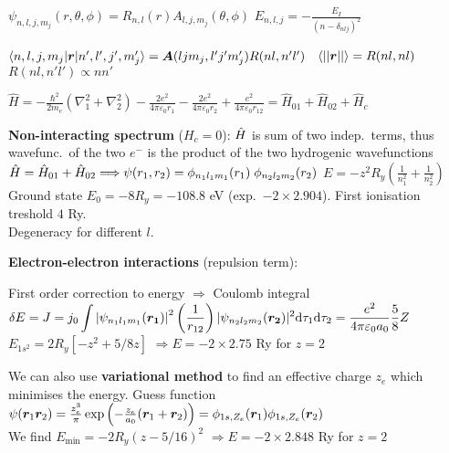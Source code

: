 
\begin{squishlist}
    \item $\psi_{n,l,j,m_j}(r,\theta, \phi) = R_{n,l}(r) A_{l,j,m_j}(\theta,\phi)$ \quad $E_{n,l,j} = - \frac{E_I}{(n - \delta_{nlj})^2}$
    \item $\braket{n,l,j,m_j|\bm{r}|n',l',j',m_j'} = \bm{A}(ljm_j, l'j'm_j')R(nl,n'l')$ \, $\braket{||\bm{r}||} = R(nl,nl)$ \, $R(nl,n'l') \propto nn'$
\end{squishlist}

\begin{squishlist}
    \item $\hat{H} = - \frac{\hbar^2}{2m_e}(\nabla^2_1 + \nabla^2_2) - \frac{2e^2}{4\pi \varepsilon_0 r_1} - \frac{2e^2}{4\pi \varepsilon_0 r_2} + \frac{e^2}{4\pi \varepsilon_0 r_{12}} = \hat{H}_{01} + \hat{H}_{02} + \hat{H}_c$
    \item \textbf{Non-interacting spectrum} ($H_c = 0$): $\hat{H}$ is sum of two indep.\ terms, thus wavefunc.\ of the two $e^-$ is the product of the two hydrogenic wavefunctions \\
    $ \hat{H} = \hat{H}_{01} + \hat{H}_{02} \Longrightarrow \psi(r_1,r_2) = \phi_{n_1 l_1 m_1}(r_1) \; \phi_{n_2 l_2 m_2}(r_2)$ \qquad $E = -z^2 R_y \left( \frac{1}{n_1^2}+ \frac{1}{n_2^2} \right)$ \\
    Ground state $E_0 = -8 R_y = -108.8$ eV (exp.\ $-2\times 2.904$). First ionisation treshold $4$ Ry. \\
    Degeneracy for different $l$.

    \item \textbf{Electron-electron interactions} (repulsion term):
    \begin{squishitemize}
        \item First order correction to energy $\Rightarrow$ Coulomb integral \\
        $ \displaystyle \delta E = J = j_0 \int \left|\psi_{n_1 l_1 m_1}(\bm{r_1})\right|^2 \left(\frac{1}{r_{12}}\right) |\psi_{n_2 l_2 m_2}(\bm{r_2})|^2  \textrm{d} \tau_1 \textrm{d} \tau_2 = \frac{e^2}{4 \pi \varepsilon_0 a_0} \frac{5}{8}Z$ \\
        $E_{1s^2} = 2 R_y [-z^2 + 5/8 z]$ \qquad $\Longrightarrow E = -2\times 2.75$ Ry for $z=2$
        \item We can also use \textbf{variational method} to find an effective charge $z_e$ which minimises the energy. Guess function $\psi(\bm{r}_1 \bm{r}_2) = \frac{z_e^3}{\pi}\exp\left(-\frac{z_e}{a_0}(\bm{r}_1 + \bm{r}_2) \right) = \phi_{1s,Z_e}(\bm{r}_1)\phi_{1s,Z_e}(\bm{r}_2)$ \\
        We find $E_{\min} = -2 R_y (z - 5/16)^2$ \qquad $\Longrightarrow E = -2\times 2.848$ Ry for $z=2$ 
    \end{squishitemize}


\end{squishlist}
